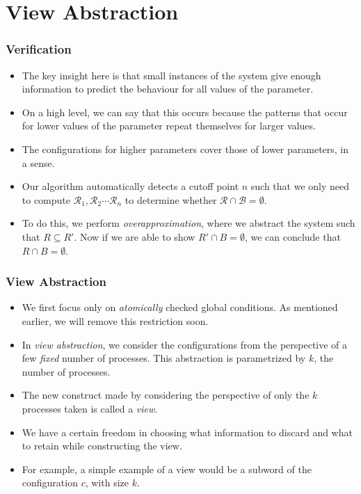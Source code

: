 \documentclass{beamer}
\begin{document}
    \section{View Abstraction}
    {
        \begin{frame}
            \frametitle{Verification}
            \begin{itemize}
                \item The key insight here is that small instances of the system give enough information to predict the behaviour for all values of 
                the parameter.
                \item On a high level, we can say that this occurs because the patterns that occur for lower values of the parameter repeat themselves for larger values.
                \item The configurations for higher parameters cover those of lower parameters, in a sense.
                \item Our algorithm automatically detects a cutoff point $n$ such that we only need to compute $\mathcal{R}_{1}, \mathcal{R}_{2} \cdots \mathcal{R}_{n}$ to determine whether $\mathcal{R} \cap \mathcal{B} = \emptyset$. 
                \item To do this, we perform \textit{overapproximation}, where we abstract the system such that $R \subseteq R'$. Now if we are able to show $R' \cap B = \emptyset$, we can conclude that $R \cap B = \emptyset$.
            \end{itemize}
        \end{frame}

        \begin{frame}
            \frametitle{View Abstraction}
            \begin{itemize}
                \item We first focus only on \textit{atomically} checked global conditions. As mentioned earlier, we will remove this restriction soon.
                \item In \textit{view abstraction}, we consider the configurations from the perspective of a few \textit{fixed} number of processes. This abstraction is parametrized by $k$, the number of processes.
                \item The new construct made by considering the perspective of only the $k$ processes taken is called a \textit{view}.
                \item We have a certain freedom in choosing what information to discard and what to retain while constructing the view.
                \item For example, a simple example of a view would be a subword of the configuration $c$, with size $k$.
            \end{itemize}
        \end{frame}

}
\end{document}
